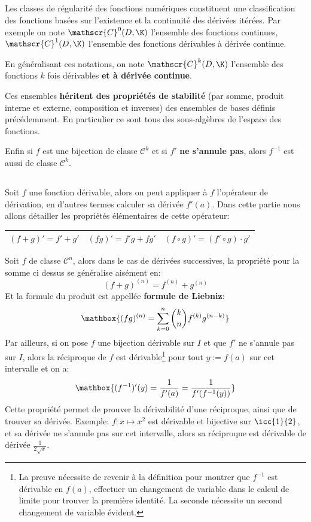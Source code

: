 \subsection*{}
Les classes de régularité des fonctions numériques constituent une classification des fonctions basées sur l'existence et la continuité des dérivées itérées.
Par exemple on note \(\mathscr{C}^0(D, \K)\) l'ensemble des fonctions continues, \(\mathscr{C}^1(D, \K)\) l'ensemble des fonctions dérivables à dérivée continue.\<

En généralisant ces notations, on note \(\mathscr{C}^k(D, \K)\) l'ensemble des fonctions \(k\) fois dérivables \textbf{et à dérivée continue}.\<

Ces ensembles \textbf{héritent des propriétés de stabilité} (par somme, produit interne et externe, composition et inverses) des ensembles de bases définis précédemment. En particulier ce sont tous des sous-algèbres de l'espace des fonctions.\<

Enfin si \(f\) est une bijection de classe \(\mathscr{C}^k\) et si \(f'\) \textbf{ne s'annule pas}, alors \(f^{-1}\) est aussi de classe \(\mathscr{C}^k\).

\subsection*{}
Soit \(f\) une fonction dérivable, alors on peut appliquer à \(f\) l'opérateur de dérivation, en d'autres termes calculer sa dérivée \(f'(a)\). Dans cette partie nous allons détailler les propriétés élémentaires de cette opérateur:
\begin{center}
   \renewcommand{\arraystretch}{1.5}%
   \begin{tabular}{| c | c | c |}
   \hline
   \((f + g)' = f' + g'\) & \((fg)' = f'g + fg'\)  & \((f \circ g)' = (f' \circ g) \cdot g'\) \\ [1ex]
   \hline
   \end{tabular}
\end{center}  
Soit \(f\) de classe \(\mathscr{C}^n\), alors dans le cas de dérivées successives, la propriété pour la somme ci dessus se généralise aisément en:
\[
   (f + g)^{(n)} = f^{(n)} + g^{(n)}
\]
Et la formule du produit est appellée \textbf{formule de Liebniz}:
\[
   \mathbox{(fg)^{(n)} = \sum_{k=0}^{n}\binom{k}{n}f^{(k)}g^{(n - k)} }
\]
Par ailleurs, si on pose \(f\) une bijection dérivable sur \(I\) et que \(f'\) ne s'annule pas sur \(I\), alors la réciproque de \(f\) est dérivable\footnote[1]{La preuve nécessite de revenir à la définition pour montrer que \(f^{-1}\) est dérivable en \(f(a)\), effectuer un changement de variable dans le calcul de limite pour trouver la première identité. La seconde nécessite un second changement de variable évident.} pour tout \(y := f(a)\) sur cet intervalle et on a:
\[
   \mathbox{(f^{-1})'(y) = \frac{1}{f'(a)} = \frac{1}{f'(f^{-1}(y))}}
\]
Cette propriété permet de prouver la dérivabilité d'une réciproque, ainsi que de trouver sa dérivée.\+
Exemple: \(f: x \mapsto x^2\) est dérivable et bijective sur \(\icc{1}{2}\), et sa dérivée ne s'annule pas sur cet intervalle, alors sa réciproque est dérivable de dérivée \(\frac{1}{2\sqrt{x}}\).

